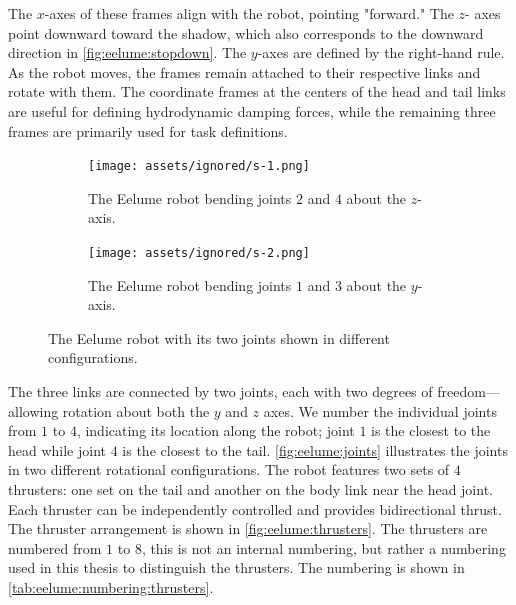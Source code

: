 The $x$-axes of these frames align with the robot, pointing "forward." The $z$-
axes point downward toward the shadow, which also corresponds to the downward 
direction in \autoref{fig:eelume:stopdown}. The $y$-axes are defined by the 
right-hand rule. As the robot moves, the frames remain attached to their 
respective links and rotate with them. The coordinate frames at the centers of 
the head and tail links are useful for defining hydrodynamic damping forces, 
while the remaining three frames are primarily used for task definitions.
\begin{figure}[h!]
    \centering
    \begin{subfigure}{0.45\textwidth}
        \centering
        \texttt{[image: assets/ignored/s-1.png]}
        \caption{The Eelume robot bending joints \(2\) and \(4\) about the $z$-axis.}
        \label{fig:eelume:joints:1}
    \end{subfigure}
    \hfill
    \begin{subfigure}{0.45\textwidth}
        \centering
        \texttt{[image: assets/ignored/s-2.png]}
        \caption{The Eelume robot bending joints \(1\) and \(3\) about the $y$-axis.}
        \label{fig:eelume:joints:2}
    \end{subfigure}
    \caption{The Eelume robot with its two joints shown in different configurations.}
\label{fig:eelume:joints}
\end{figure}
The three links are connected by two joints, each with two degrees of freedom—
allowing rotation about both the $y$ and $z$ axes. We number the individual joints from
\(1\) to \(4\), indicating its location along the robot; joint \(1\) is
the closest to the head while joint \(4\) is the closest to the tail.
\autoref{fig:eelume:joints} illustrates the joints in two different rotational configurations. The robot 
features two sets of $4$ thrusters: one set on the tail and another on the 
body link near the head joint. Each thruster can be independently controlled 
and provides bidirectional thrust. The thruster arrangement is shown in
\autoref{fig:eelume:thrusters}. The thrusters are numbered from \(1\) to \(8\),
this is not an internal numbering, but rather a numbering used in this thesis
to distinguish the thrusters. The numbering is shown in \autoref{tab:eelume:numbering:thrusters}.
